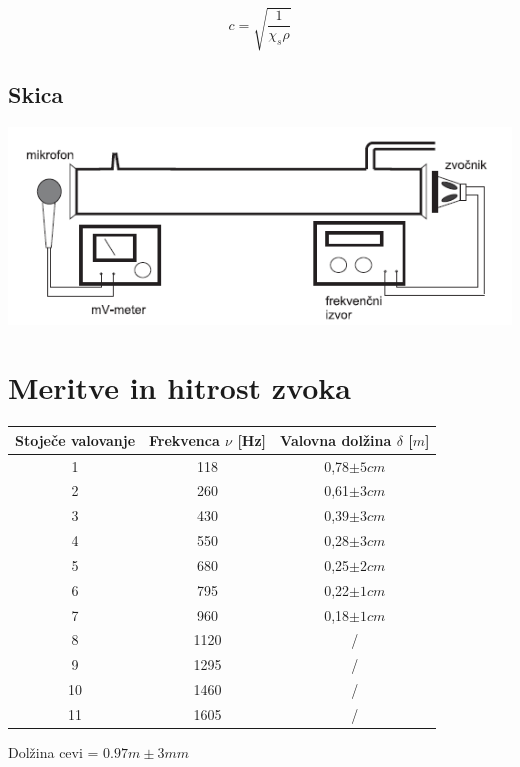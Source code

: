 \documentclass[a4paper]{report}
\begin{document}
\begin{equation}
  c = \sqrt{\frac{1}{\chi_s \rho}}
\end{equation}


\section*{Skica}

\includegraphics[width=\textwidth]{Skica}



\chapter*{Meritve in hitrost zvoka}

\begin{center}
  \begin{tabular}{| c | c | c |}
    \hline
    Stoječe valovanje & Frekvenca $\nu$ [Hz] & Valovna dolžina $\delta$ [$m$] \\ \hline
    1 & 118 & 0,78$\pm 5cm$ \\ \hline
    2 & 260 & 0,61$\pm 3cm$ \\ \hline
    3 & 430 & 0,39$\pm 3cm$ \\ \hline
    4 & 550 & 0,28$\pm 3cm$ \\ \hline
    5 & 680 & 0,25$\pm 2cm$ \\ \hline
    6 & 795 & 0,22$\pm 1cm$ \\ \hline
    7 & 960 & 0,18$\pm 1cm$ \\ \hline
    8 & 1120 & / \\ \hline
    9 & 1295 & / \\ \hline
    10 & 1460 & / \\ \hline
    11 & 1605 & / \\ \hline

  \end{tabular}
\end{center}

\noindent Dolžina cevi = $0.97m \pm 3mm$
\end{document}
